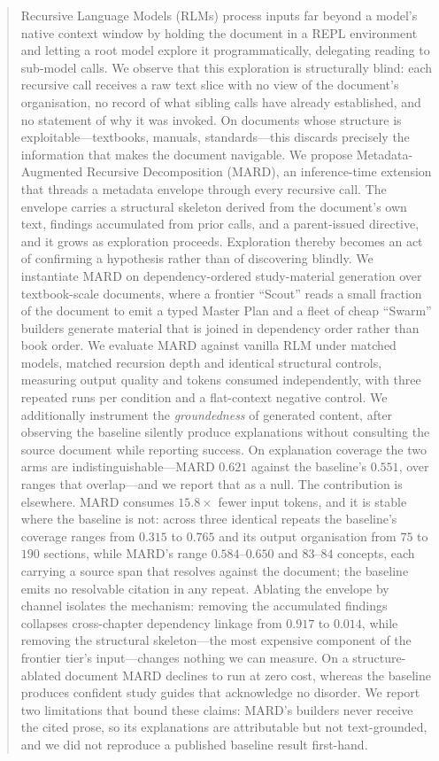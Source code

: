 \documentclass[conference]{IEEEtran}
\begin{document}
\begin{abstract}
Recursive Language Models (RLMs) process inputs far beyond a model's
native context window by holding the document in a REPL environment and
letting a root model explore it programmatically, delegating reading to
sub-model calls. We observe that this exploration is structurally blind:
each recursive call receives a raw text slice with no view of the
document's organisation, no record of what sibling calls have already
established, and no statement of why it was invoked. On documents whose
structure is exploitable---textbooks, manuals, standards---this discards
precisely the information that makes the document navigable. We propose
Metadata-Augmented Recursive Decomposition (MARD), an inference-time
extension that threads a metadata envelope through every recursive call.
The envelope carries a structural skeleton derived from the document's own
text, findings accumulated from prior calls, and a parent-issued directive,
and it grows as exploration proceeds. Exploration thereby becomes an act of
confirming a hypothesis rather than of discovering blindly. We instantiate
MARD on dependency-ordered study-material generation over textbook-scale
documents, where a frontier ``Scout'' reads a small fraction of the document
to emit a typed Master Plan and a fleet of cheap ``Swarm'' builders generate
material that is joined in dependency order rather than book order. We
evaluate MARD against vanilla RLM under matched models, matched recursion
depth and identical structural controls, measuring output quality and tokens
consumed independently, with three repeated runs per condition and a
flat-context negative control. We additionally instrument the
\emph{groundedness} of generated content, after observing the baseline
silently produce explanations without consulting the source document while
reporting success.
On explanation coverage the two arms are indistinguishable---MARD $0.621$
against the baseline's $0.551$, over ranges that overlap---and we report that
as a null. The contribution is elsewhere. MARD consumes $15.8\times$ fewer
input tokens, and it is stable where the baseline is not: across three
identical repeats the baseline's coverage ranges from $0.315$ to $0.765$ and
its output organisation from $75$ to $190$ sections, while MARD's range
$0.584$--$0.650$ and $83$--$84$ concepts, each carrying a source span that
resolves against the document; the baseline emits no resolvable citation in
any repeat. Ablating the envelope by channel isolates the mechanism: removing
the accumulated findings collapses cross-chapter dependency linkage from
$0.917$ to $0.014$, while removing the structural skeleton---the most
expensive component of the frontier tier's input---changes nothing we can
measure. On a structure-ablated document MARD declines to run at zero cost,
whereas the baseline produces confident study guides that acknowledge no
disorder. We report two limitations that bound these claims: MARD's builders
never receive the cited prose, so its explanations are attributable but not
text-grounded, and we did not reproduce a published baseline result
first-hand.
\end{abstract}
\end{document}
